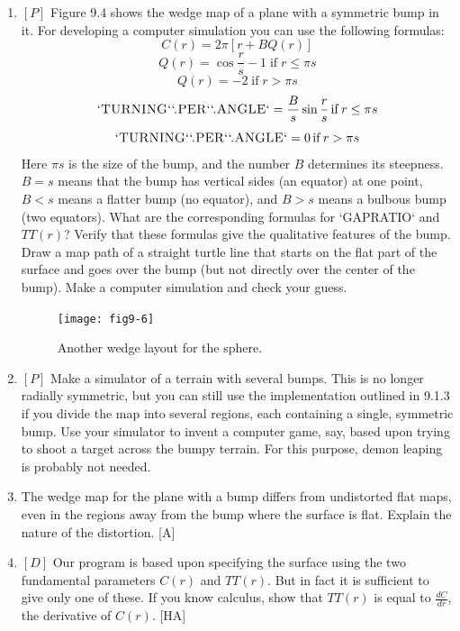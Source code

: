 \documentclass{book}
\begin{document}
\begin{enumerate}
\item $[P]$ Figure 9.4 shows the wedge map of a plane with a symmetric bump
in it. For developing a computer simulation you can use the following
formulas:
$$ C(r) = 2 \pi [ r + BQ(r) ] $$
$$ Q(r) = \cos \frac {r} {s} - 1 \operatorname{if}  r \leq \pi s $$
$$ Q(r) = -2  \operatorname{if}  r > \pi s $$
$$\text{\textsc{`TURNING`}\textsc{`.PER`}\textsc{`.ANGLE`}} =  \frac {B} {s} \sin \frac {r} {s}  \operatorname{if}  r \le \pi s $$
$$\text{\textsc{`TURNING`}\textsc{`.PER`}\textsc{`.ANGLE`}} =  0  \operatorname{if}  r > \pi s $$
Here $ \pi s $ is the size of the bump, and the number $B$ determines its
steepness. $B = s$ means that the bump has vertical sides (an equator) at
one point, $B < s$ means a flatter bump (no equator), and $B > s$ means
a bulbous bump (two equators). What are the corresponding formulas
for \textsc{`GAPRATIO`} and $TT(r)$? Verify that these formulas give the qualitative
features of the bump. Draw a map path of a straight turtle line that
starts on the flat part of the surface and goes over the bump (but not
directly over the center of the bump). Make a computer simulation and
check your guess.

\begin{figure}
\begin{center}
\texttt{[image: fig9-6]}
\caption{Another wedge layout for the sphere.}
\end{center}
\end{figure}


\item $[P]$ Make a simulator of a terrain with several bumps. This is no longer
radially symmetric, but you can still use the implementation outlined in
9.1.3 if you divide the map into several regions, each containing a single,
symmetric bump. Use your simulator to invent a computer game, say,
based upon trying to shoot a target across the bumpy terrain. For this
purpose, demon leaping is probably not needed.

\item The wedge map for the plane with a bump differs from undistorted
flat maps, even in the regions away from the bump where the surface is
flat. Explain the nature of the distortion. [A]

\item $[D]$ Our program is based upon specifying the surface using the two
fundamental parameters $C(r)$ and $TT(r)$. But in fact it is sufficient to
give only one of these. If you know calculus, show that $TT(r)$ is equal
to $\frac {dC} {dr}$, the derivative of $C(r)$. [HA]


\end{enumerate}
\end{document}
